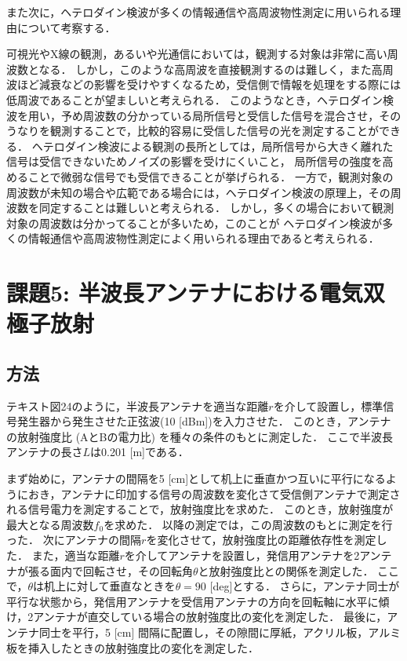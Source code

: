 \documentclass[uplatex,dvipdfmx,a4j,12pt]{jsarticle}
\begin{document}
また次に，ヘテロダイン検波が多くの情報通信や高周波物性測定に用いられる理由について考察する．

可視光やX線の観測，あるいや光通信においては，観測する対象は非常に高い周波数となる．
しかし，このような高周波を直接観測するのは難しく，また高周波ほど減衰などの影響を受けやすくなるため，受信側で情報を処理をする際には低周波であることが望ましいと考えられる．
このようなとき，ヘテロダイン検波を用い，予め周波数の分かっている局所信号と受信した信号を混合させ，そのうなりを観測することで，比較的容易に受信した信号の光を測定することができる．
ヘテロダイン検波による観測の長所としては，局所信号から大きく離れた信号は受信できないためノイズの影響を受けにくいこと，
局所信号の強度を高めることで微弱な信号でも受信できることが挙げられる\cite{heterodyne}．
一方で，観測対象の周波数が未知の場合や広範である場合には，ヘテロダイン検波の原理上，その周波数を同定することは難しいと考えられる．
しかし，多くの場合において観測対象の周波数は分かってることが多いため，このことが
ヘテロダイン検波が多くの情報通信や高周波物性測定によく用いられる理由であると考えられる．




\section{課題5: 半波長アンテナにおける電気双極子放射}
\subsection{方法}
テキスト図24のように，半波長アンテナを適当な距離$r$を介して設置し，標準信号発生器から発生させた正弦波(10 [dBm])を入力させた．
このとき，アンテナの放射強度比 (AとBの電力比) を種々の条件のもとに測定した．
ここで半波長アンテナの長さ$L$は0.201 [m]である．

まず始めに，アンテナの間隔を5 [cm]として机上に垂直かつ互いに平行になるようにおき，アンテナに印加する信号の周波数を変化さて受信側アンテナで測定される信号電力を測定することで，放射強度比を求めた．
このとき，放射強度が最大となる周波数$f_0$を求めた．
以降の測定では，この周波数のもとに測定を行った．
次にアンテナの間隔$r$を変化させて，放射強度比の距離依存性を測定した．
また，適当な距離$r$を介してアンテナを設置し，発信用アンテナを2アンテナが張る面内で回転させ，その回転角$\theta$と放射強度比との関係を測定した．
ここで，$\theta$は机上に対して垂直なときを$\theta = 90$ [deg]とする．
さらに，アンテナ同士が平行な状態から，発信用アンテナを受信用アンテナの方向を回転軸に水平に傾け，2アンテナが直交している場合の放射強度比の変化を測定した．
最後に，アンテナ同士を平行，5 [cm] 間隔に配置し，その隙間に厚紙，アクリル板，アルミ板を挿入したときの放射強度比の変化を測定した．
\end{document}
